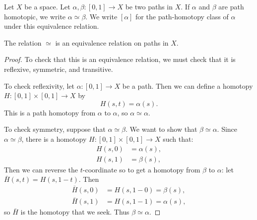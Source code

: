 \documentclass[noname]{notes}
\begin{document}
\begin{definition}
	Let $X$ be a space. Let $\alpha, \beta \colon [0,1] \to X$ be two paths in $X$. If $\alpha$ and $\beta$ are path homotopic, we write $\alpha \simeq \beta$. We write $[\alpha]$ for the path-homotopy class of $\alpha$ under this equivalence relation. 
\end{definition}

\begin{proposition}
	The relation $\simeq$ is an equivalence relation on paths in $X$. 
\end{proposition}

\begin{proof}
	To check that this is an equivalence relation, we must check that it is reflexive, symmetric, and transitive. 
	
	To check reflexivity, let $\alpha \colon [0,1] \to X$ be a path. Then we can define a homotopy $H \colon [0,1] \times [0,1] \to X$ by 
	\[
		H(s,t) = \alpha(s). 
	\]
	This is a path homotopy from $\alpha$ to $\alpha$, so $\alpha \simeq \alpha$. 
	
	To check symmetry, suppose that $\alpha \simeq \beta$. We want to show that $\beta \simeq \alpha$. Since $\alpha \simeq \beta$, there is a homotopy $H \colon [0,1] \times [0,1] \to X$ such that:
	\begin{align*}
		H(s,0) &= \alpha(s),\\
		H(s,1) &= \beta(s),
	\end{align*}
	Then we can reverse the $t$-coordinate so to get a homotopy from $\beta$ to $\alpha$: let $\bar{H}(s,t) = H(s,1-t)$. Then 
	\begin{align*}
		\bar H(s,0) &= H(s,1-0) = \beta(s),\\
		\bar H(s,1) &= H(s,1-1) = \alpha(s),
	\end{align*}
	so $\bar H$ is the homotopy that we seek. Thus $\beta \simeq \alpha$. 
	

\end{proof}
\end{document}
